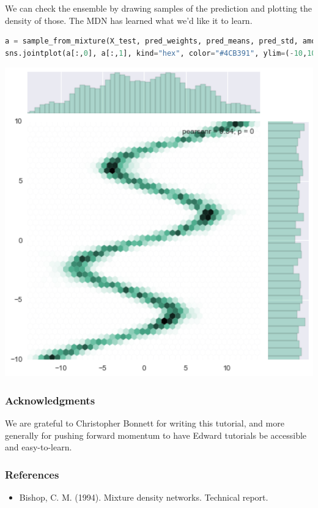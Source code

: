 We can check the ensemble by drawing samples of the prediction and
plotting the density of those. The MDN has learned what we'd like it
to learn.

\begin{lstlisting}[language=Python]
a = sample_from_mixture(X_test, pred_weights, pred_means, pred_std, amount=len(X_test))
sns.jointplot(a[:,0], a[:,1], kind="hex", color="#4CB391", ylim=(-10,10), xlim=(-14,14))
\end{lstlisting}

\includegraphics[width=700px]{images/mdn-fig3.png}

\subsubsection{Acknowledgments}

We are grateful to Christopher Bonnett for writing this tutorial, and
more generally for pushing forward momentum to have Edward tutorials
be accessible and easy-to-learn.

\subsubsection{References}\label{references}

\begin{itemize}
\item
  Bishop, C. M. (1994). Mixture density networks. Technical report.
\end{itemize}
